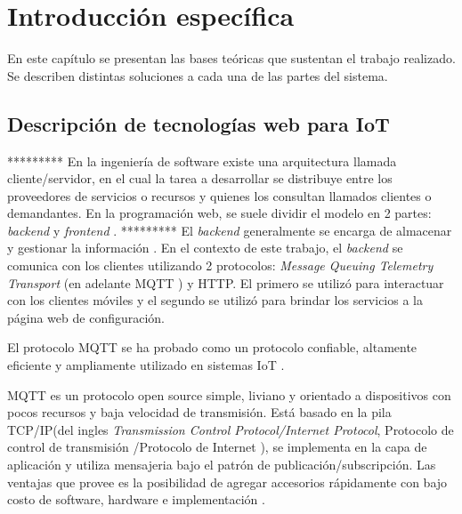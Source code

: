 \chapter{Introducción específica} %

\label{Chapter2}

En este capítulo se presentan las bases teóricas que sustentan el trabajo realizado. Se describen distintas soluciones a cada una de las partes del sistema.

\section{Descripción de tecnologías web para IoT}
\label{sec:Descripción de tecnologías web para IoT}
*********
En la ingeniería de software existe una arquitectura llamada cliente/servidor, en el cual la tarea a desarrollar se  distribuye entre los proveedores de servicios o recursos y quienes los consultan llamados clientes o demandantes. En la programación web, se suele dividir el modelo en 2 partes: \textit{ backend} y \textit{frontend} .
*********
El \textit{backend}  generalmente se encarga de almacenar y gestionar la información \citep{ARTICLE:4}. En el contexto de este trabajo, el \textit{backend} se comunica con los clientes utilizando 2 protocolos: \textit{Message Queuing Telemetry Transport} (en adelante MQTT )  y HTTP. El primero se utilizó para interactuar con los clientes móviles y el segundo se utilizó para brindar los servicios a la página web de configuración.

El protocolo MQTT \citep{ WEBSITE:5} se ha probado como un protocolo confiable, altamente eficiente y ampliamente utilizado en sistemas IoT \citep{ARTICLE:2}.

MQTT es un protocolo open source simple, liviano y orientado a dispositivos con pocos recursos y baja velocidad de transmisión. Está basado en la pila TCP/IP(del ingles \textit{Transmission Control Protocol/Internet Protocol}, Protocolo de control de transmisión /Protocolo de Internet ), se implementa en la capa de aplicación y utiliza mensajeria bajo el patrón de publicación/subscripción. Las ventajas que provee es la posibilidad de agregar accesorios rápidamente con bajo costo de software, hardware e implementación \citep{ARTICLE:2}.

